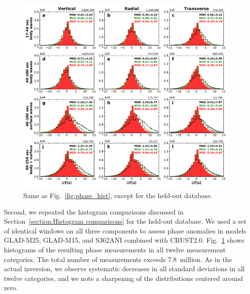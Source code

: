 \documentclass[extra,mreferee]{gji}
\begin{document}
\begin{figure}
  \centering
  \includegraphics[width=\textwidth]{figures/dt_histogram_360.pdf}
  \caption{\small{Same as Fig.~\ref{fig:phase_hist}, except for the held-out database.
  }}
  \label{fig:phase_hist_360}
\end{figure}


Second, we repeated the histogram comparisons discussed in
Section~\ref{section:Histogram comparisons} for the held-out database.
We used a set of identical windows on all three components to assess
phase anomalies in models GLAD-M25, GLAD-M15, and S362ANI combined with CRUST2.0.
Fig.~\ref{fig:phase_hist_360} shows histograms of the resulting phase
measurements in all twelve measurement categories.
The total number of measurements exceeds 7.8~million.
As in the actual inversion,
we observe systematic decreases in all standard deviations in all twelve categories,
and we note a sharpening of the distributions centered around zero.

\end{document}

